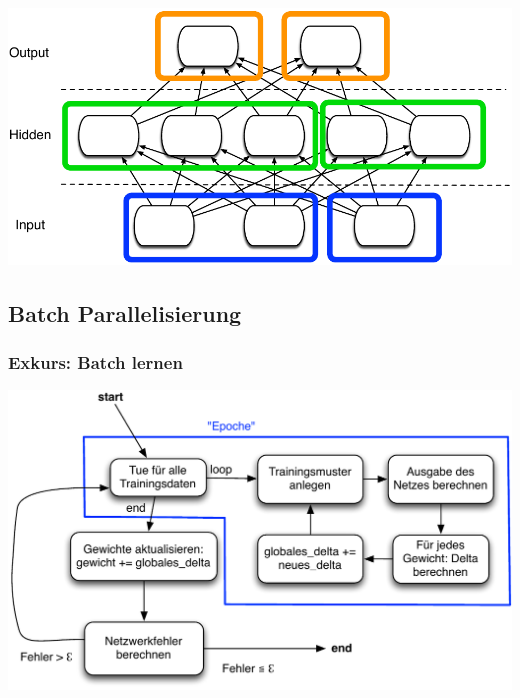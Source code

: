 \documentclass[18pt]{beamer}
\begin{document}
\begin{frame}
\begin{itemize}
	
		\end{itemize}	
		\begin{center}
			\includegraphics[scale=0.25]{Grafiken/Feingranular.pdf}
		\end{center}
	\end{frame}
	
	\subsection{Batch Parallelisierung}
	\begin{frame}[c]\frametitle{Exkurs: Batch lernen}
		\begin{center}
			\includegraphics[scale=0.6]{Grafiken/Batchlearning.pdf}		    
		\end{center}	
	\end{frame}
\end{document}
